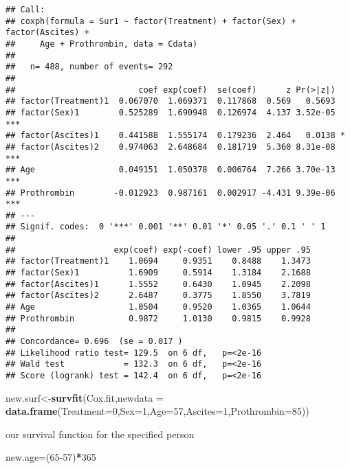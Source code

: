 \documentclass[
]{article}
\newenvironment{Shaded}{\begin{snugshade}}{\end{snugshade}}
\newcommand{\DataTypeTok}[1]{\textcolor[rgb]{0.13,0.29,0.53}{#1}}
\newcommand{\DecValTok}[1]{\textcolor[rgb]{0.00,0.00,0.81}{#1}}
\newcommand{\KeywordTok}[1]{\textcolor[rgb]{0.13,0.29,0.53}{\textbf{#1}}}
\newcommand{\NormalTok}[1]{#1}
\newcommand{\OperatorTok}[1]{\textcolor[rgb]{0.81,0.36,0.00}{\textbf{#1}}}
\begin{document}
\begin{verbatim}
## Call:
## coxph(formula = Sur1 ~ factor(Treatment) + factor(Sex) + factor(Ascites) + 
##     Age + Prothrombin, data = Cdata)
## 
##   n= 488, number of events= 292 
## 
##                         coef exp(coef)  se(coef)      z Pr(>|z|)    
## factor(Treatment)1  0.067070  1.069371  0.117868  0.569   0.5693    
## factor(Sex)1        0.525289  1.690948  0.126974  4.137 3.52e-05 ***
## factor(Ascites)1    0.441588  1.555174  0.179236  2.464   0.0138 *  
## factor(Ascites)2    0.974063  2.648684  0.181719  5.360 8.31e-08 ***
## Age                 0.049151  1.050378  0.006764  7.266 3.70e-13 ***
## Prothrombin        -0.012923  0.987161  0.002917 -4.431 9.39e-06 ***
## ---
## Signif. codes:  0 '***' 0.001 '**' 0.01 '*' 0.05 '.' 0.1 ' ' 1
## 
##                    exp(coef) exp(-coef) lower .95 upper .95
## factor(Treatment)1    1.0694     0.9351    0.8488    1.3473
## factor(Sex)1          1.6909     0.5914    1.3184    2.1688
## factor(Ascites)1      1.5552     0.6430    1.0945    2.2098
## factor(Ascites)2      2.6487     0.3775    1.8550    3.7819
## Age                   1.0504     0.9520    1.0365    1.0644
## Prothrombin           0.9872     1.0130    0.9815    0.9928
## 
## Concordance= 0.696  (se = 0.017 )
## Likelihood ratio test= 129.5  on 6 df,   p=<2e-16
## Wald test            = 132.3  on 6 df,   p=<2e-16
## Score (logrank) test = 142.4  on 6 df,   p=<2e-16
\end{verbatim}

\begin{Shaded}
\begin{Highlighting}[]
\NormalTok{new.surf<-}\KeywordTok{survfit}\NormalTok{(Cox.fit,}\DataTypeTok{newdata =} \KeywordTok{data.frame}\NormalTok{(}\DataTypeTok{Treatment=}\DecValTok{0}\NormalTok{,}\DataTypeTok{Sex=}\DecValTok{1}\NormalTok{,}\DataTypeTok{Age=}\DecValTok{57}\NormalTok{,}\DataTypeTok{Ascites=}\DecValTok{1}\NormalTok{,}\DataTypeTok{Prothrombin=}\DecValTok{85}\NormalTok{))}
\end{Highlighting}
\end{Shaded}

our survival function for the specified person

\begin{Shaded}
\begin{Highlighting}[]
\NormalTok{new.age=(}\DecValTok{65-57}\NormalTok{)}\OperatorTok{*}\DecValTok{365}
\end{Highlighting}
\end{Shaded}
\end{document}
